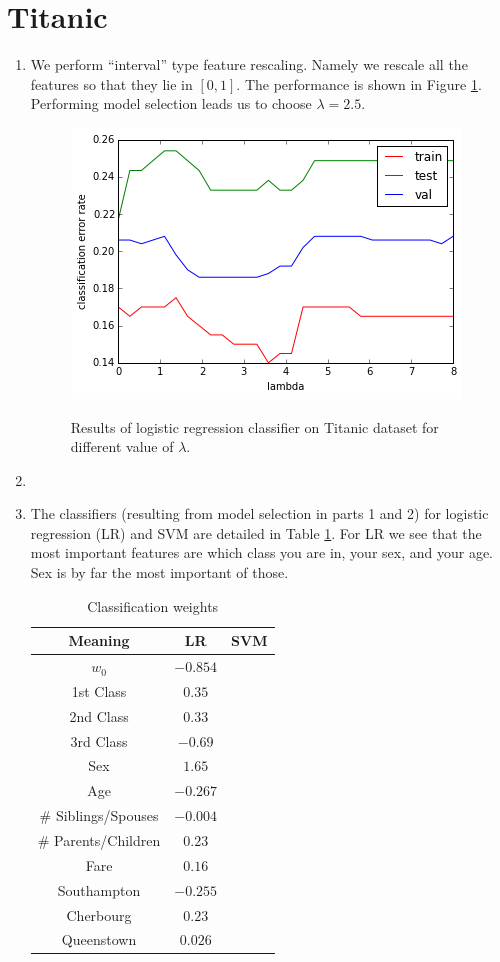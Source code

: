 \documentclass[10pt]{article}
\begin{document}
\section{Titanic}

\begin{enumerate}
\item We perform ``interval'' type feature rescaling. Namely we rescale all the features so that they lie in $[0,1]$. The performance is shown in Figure \ref{titanic_logit}. Performing model selection leads us to choose $\lambda = 2.5$.
 \begin{figure}
 \centering
 \includegraphics[scale=0.5]{titanic_logit.png}
 \label{titanic_logit}
 \caption{Results of logistic regression classifier on Titanic dataset for different value of $\lambda$.}
 \end{figure}

 \item 

 \item The classifiers (resulting from model selection in parts 1 and 2) for logistic regression (LR) and SVM are detailed in Table \ref{weights}. For LR we see that the most important features are which class you are in, your sex, and your age. Sex is by far the most important of those.
 \begin{table}[H]
 \begin{tabular}{|c|c|c|}
 \hline
 Meaning & LR & SVM \\ \hline
 $w_0$ & $-0.854$ & \\ \hline
 1st Class & $0.35$ & \\ \hline
 2nd Class & $0.33$ & \\ \hline
 3rd Class & $-0.69$ & \\ \hline
 Sex  & $1.65$ & \\ \hline
 Age & $-0.267$ & \\ \hline
 \# Siblings/Spouses & $-0.004$ & \\ \hline
 \# Parents/Children & $0.23$ & \\ \hline
 Fare & $0.16$ & \\ \hline
 Southampton & $-0.255$ & \\ \hline
 Cherbourg & $0.23$ & \\ \hline
 Queenstown & $0.026$ & \\ \hline
 \end{tabular}
 \caption{Classification weights}
 \label{weights}
 \end{table}


\end{enumerate}
\end{document}
